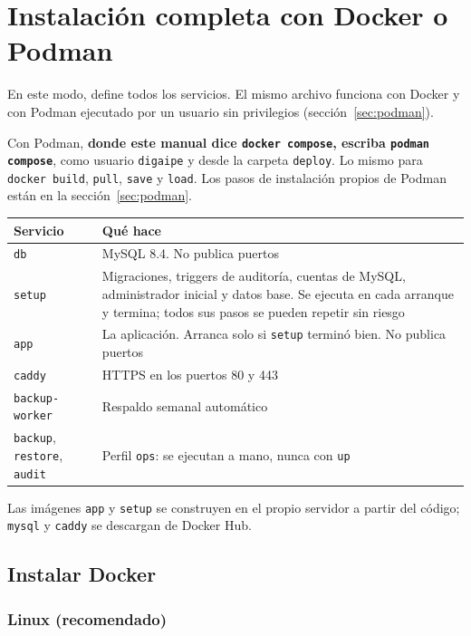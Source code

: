 \chapter{Instalación completa con Docker o Podman}
\label{cap:docker}

En este modo,  define todos los servicios. El mismo archivo funciona
con Docker y con Podman ejecutado por un usuario sin privilegios (sección~\ref{sec:podman}).

\begin{nota}[Podman]
	Con Podman, \textbf{donde este manual dice \texttt{docker compose}, escriba
	\texttt{podman compose}}, como usuario \texttt{digaipe} y desde la carpeta \texttt{deploy}.
	Lo mismo para \texttt{docker build}, \texttt{pull}, \texttt{save} y \texttt{load}. Los pasos de
	instalación propios de Podman están en la sección~\ref{sec:podman}.
\end{nota}

\begin{xltabular}{\linewidth}{@{}l L@{}}
	\toprule
	\textbf{Servicio} & \textbf{Qué hace} \\
	\midrule
	\endhead
	\texttt{db} & MySQL 8.4. No publica puertos \\
	\texttt{setup} & Migraciones, triggers de auditoría, cuentas de MySQL, administrador
	inicial y datos base. Se ejecuta en cada arranque y termina; todos sus pasos se pueden
	repetir sin riesgo \\
	\texttt{app} & La aplicación. Arranca solo si \texttt{setup} terminó bien. No publica
	puertos \\
	\texttt{caddy} & HTTPS en los puertos 80 y 443 \\
	\texttt{backup-worker} & Respaldo semanal automático \\
	\texttt{backup}, \texttt{restore}, \texttt{audit} & Perfil \texttt{ops}: se ejecutan a mano,
	nunca con \texttt{up} \\
	\bottomrule
\end{xltabular}

Las imágenes \texttt{app} y \texttt{setup} se construyen en el propio servidor a partir del
código; \texttt{mysql} y \texttt{caddy} se descargan de Docker Hub.

\section{Instalar Docker}
\label{sec:instalar-docker}

\subsection{Linux (recomendado)}

